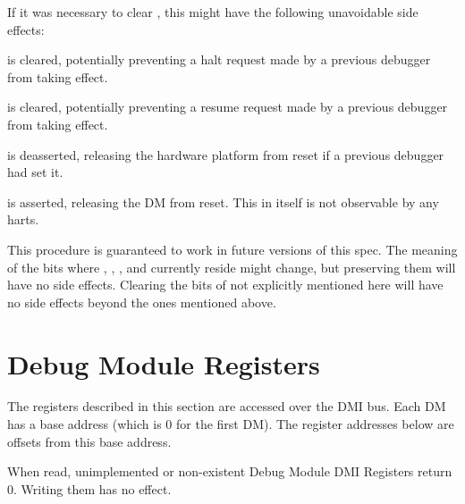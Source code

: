 \begin{steps}{If it was necessary to clear \FdmDmcontrolNdmreset, this might
        have the following unavoidable side effects:}
    \item \FdmDmcontrolHaltreq is cleared, potentially preventing a halt request made by a
        previous debugger from taking effect.
    \item \FdmDmcontrolResumereq is cleared, potentially preventing a resume request made
        by a previous debugger from taking effect.
    \item \FdmDmcontrolNdmreset is deasserted, releasing the hardware platform from reset if a
        previous debugger had set it.
    \item \FdmDmcontrolDmactive is asserted, releasing the DM from reset. This in itself
        is not observable by any harts.
\end{steps}

This procedure is guaranteed to work in future versions of this spec.  The
meaning of the \RdmDmcontrol bits where \FdmDmcontrolHartreset, \FdmDmcontrolHasel, \FdmDmcontrolHartsello, and
\FdmDmcontrolHartselhi currently reside might change, but preserving them will have no
side effects. Clearing the bits of \RdmDmcontrol not explicitly mentioned here
will have no side effects beyond the ones mentioned above.

\section{Debug Module Registers} \label{dmdebbus}

The registers described in this section are accessed over the DMI bus.  Each DM
has a base address (which is 0 for the first DM). The register addresses below
are offsets from this base address.

When read, unimplemented or non-existent Debug Module DMI Registers return 0.
Writing them has no effect.


